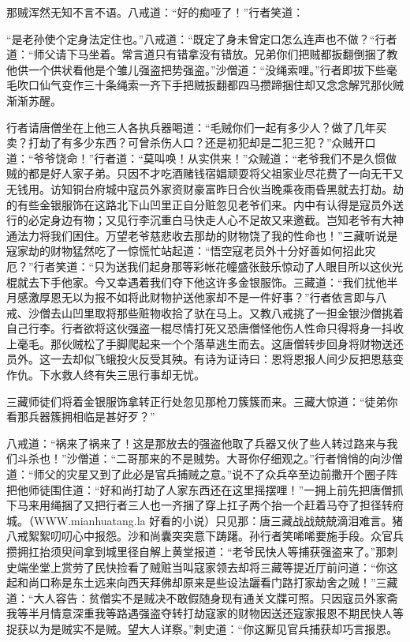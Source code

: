 \documentclass[12pt,UTF8]{ctexbook}
\begin{document}
{	那贼浑然无知不言不语。八戒道：“好的痴哑了！”行者笑道：
	
	“是老孙使个定身法定住也。”八戒道：“既定了身未曾定口怎么连声也不做？“行者道：“师父请下马坐着。常言道只有错拿没有错放。兄弟你们把贼都扳翻倒捆了教他供一个供状看他是个雏儿强盗把势强盗。”沙僧道：“没绳索哩。”行者即拔下些毫毛吹口仙气变作三十条绳索一齐下手把贼扳翻都四马攒蹄捆住却又念念解咒那伙贼渐渐苏醒。
	
	行者请唐僧坐在上他三人各执兵器喝道：“毛贼你们一起有多少人？做了几年买卖？打劫了有多少东西？可曾杀伤人口？还是初犯却是二犯三犯？”众贼开口道：“爷爷饶命！”行者道：“莫叫唤！从实供来！”众贼道：“老爷我们不是久惯做贼的都是好人家子弟。只因不才吃酒赌钱宿娼顽耍将父祖家业尽花费了一向无干又无钱用。访知铜台府城中寇员外家资财豪富昨日合伙当晚乘夜雨昏黑就去打劫。劫的有些金银服饰在这路北下山凹里正自分赃忽见老爷们来。内中有认得是寇员外送行的必定身边有物；又见行李沉重白马快走人心不足故又来邀截。岂知老爷有大神通法力将我们困住。万望老爷慈悲收去那劫的财物饶了我的性命也！”三藏听说是寇家劫的财物猛然吃了一惊慌忙站起道：“悟空寇老员外十分好善如何招此灾厄？”行者笑道：“只为送我们起身那等彩帐花幢盛张鼓乐惊动了人眼目所以这伙光棍就去下手他家。今又幸遇着我们夺下他这许多金银服饰。三藏道：“我们扰他半月感激厚恩无以为报不如将此财物护送他家却不是一件好事？”行者依言即与八戒、沙僧去山凹里取将那些赃物收拾了驮在马上。又教八戒挑了一担金银沙僧挑着自己行李。行者欲将这伙强盗一棍尽情打死又恐唐僧怪他伤人性命只得将身一抖收上毫毛。那伙贼松了手脚爬起来一个个落草逃生而去。这唐僧转步回身将财物送还员外。这一去却似飞蛾投火反受其殃。有诗为证诗曰：恩将恩报人间少反把恩慈变作仇。下水救人终有失三思行事却无忧。
	
	三藏师徒们将着金银服饰拿转正行处忽见那枪刀簇簇而来。三藏大惊道：“徒弟你看那兵器簇拥相临是甚好歹？”
	
	八戒道：“祸来了祸来了！这是那放去的强盗他取了兵器又伙了些人转过路来与我们斗杀也！”沙僧道：“二哥那来的不是贼势。大哥你仔细观之。”行者悄悄的向沙僧道：“师父的灾星又到了此必是官兵捕贼之意。”说不了众兵卒至边前撒开个圈子阵把他师徒围住道：“好和尚打劫了人家东西还在这里摇摆哩！”一拥上前先把唐僧抓下马来用绳捆了又把行者三人也一齐捆了穿上扛子两个抬一个赶着马夺了担径转府城。（WWW.mianhuatang.la 好看的小说）只见那：唐三藏战战兢兢滴泪难言。猪八戒絮絮叨叨心中报怨。沙和尚囊突突意下踌躇。孙行者笑唏唏要施手段。众官兵攒拥扛抬须臾间拿到城里径自解上黄堂报道：“老爷民快人等捕获强盗来了。”那刺史端坐堂上赏劳了民快捡看了贼赃当叫寇家领去却将三藏等提近厅前问道：“你这起和尚口称是东土远来向西天拜佛却原来是些设法躧看门路打家劫舍之贼！”三藏道：“大人容告：贫僧实不是贼决不敢假随身现有通关文牒可照。只因寇员外家斋我等半月情意深重我等路遇强盗夺转打劫寇家的财物因送还寇家报恩不期民快人等捉获以为是贼实不是贼。望大人详察。”刺史道：“你这厮见官兵捕获却巧言报恩。
	
}
\end{document}
